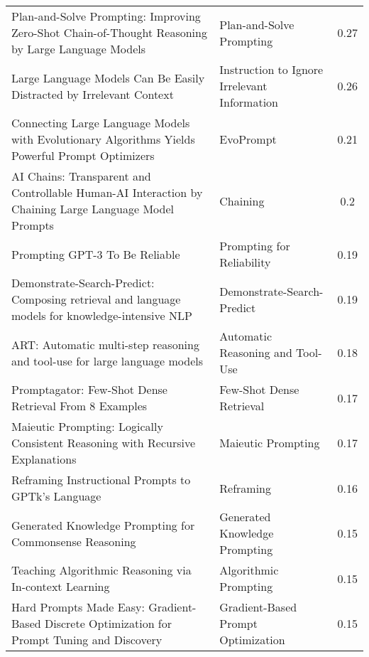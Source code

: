 \begin{tabular}{llc}
Plan-and-Solve Prompting: Improving Zero-Shot Chain-of-Thought Reasoning by Large Language Models & Plan-and-Solve Prompting & 0.27 \\
Large Language Models Can Be Easily Distracted by Irrelevant Context & Instruction to Ignore Irrelevant Information & 0.26 \\
Connecting Large Language Models with Evolutionary Algorithms Yields Powerful Prompt Optimizers & EvoPrompt & 0.21 \\
AI Chains: Transparent and Controllable Human-AI Interaction by Chaining Large Language Model Prompts & Chaining & 0.2 \\
Prompting GPT-3 To Be Reliable & Prompting for Reliability & 0.19 \\
Demonstrate-Search-Predict: Composing retrieval and language models for knowledge-intensive NLP & Demonstrate-Search-Predict & 0.19 \\
ART: Automatic multi-step reasoning and tool-use for large language models & Automatic Reasoning and Tool-Use & 0.18 \\
Promptagator: Few-Shot Dense Retrieval From 8 Examples & Few-Shot Dense Retrieval & 0.17 \\
Maieutic Prompting: Logically Consistent Reasoning with Recursive Explanations & Maieutic Prompting & 0.17 \\
Reframing Instructional Prompts to GPTk's Language & Reframing & 0.16 \\
Generated Knowledge Prompting for Commonsense Reasoning & Generated Knowledge Prompting & 0.15 \\
Teaching Algorithmic Reasoning via In-context Learning & Algorithmic Prompting & 0.15 \\
Hard Prompts Made Easy: Gradient-Based Discrete Optimization for Prompt Tuning and Discovery & Gradient-Based Prompt Optimization & 0.15 \\
\bottomrule
\end{tabular}
